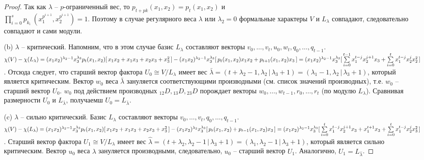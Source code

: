 \begin{proof} Так как $\lambda$ -- $p$-ограниченный вес, то $ p_{t + pk} (x_1, x_2) = p_{t} (x_1, x_2) $ и \\
$ \prod\limits_{i = 0}^{s}p_{k_i} ~(x_1^{p^{i + 1}}, x_2^{p^{i + 1}}) = 1 $. 
Поэтому в случае регулярного веса $\lambda$ или $ \lambda_2 = 0 $ формальные характеры $V$ и $ L_{\lambda} $ совпадают, 
следовательно совпадают и сами модули.

(b) $\lambda$ -- критический. Напомним, что в этом случае базис $ L_{\lambda} $ составляют векторы $ v_0, \ldots, v_t, u_0, w_t, q_0, \ldots, q_{t - 1} $.
\\
$ \chi(V) - \chi(L_{\lambda}) = (x_1 x_2)^{\lambda_2 - 1} x_3^{\lambda_3} p_t (x_1, x_2) [\,x_1 x_2 + x_1 x_3 + x_2 x_3 + x_3^2\,] - \\ 
(x_1 x_2)^{\lambda_2 - 1} x_3^{\lambda_3} [\,p_t (x_1, x_2) x_1 x_2 + p_{t + 1} (x_1, x_2) x_3\,] = (x_1 x_2)^{\lambda_2 - 1} x_3^{\lambda_3} 
[\,\sum \limits_{i = 0}^{t - 1} x_1^{t - j} x_2^{j + 1} x_3 + \sum \limits_{i = 0}^t x_1^{t - j} x_2^j x_2^2 \,] $.
Отсюда следует, что старший вектор фактора $ U_0 \cong V/L_{\lambda} $ имеет вес 
$ \bar{\lambda} = (t + \lambda_2 - 1, \lambda_2 \,|\, \lambda_3 + 1) = (\lambda_1 - 1, \lambda_2 \,|\, \lambda_3 + 1) $, который является критическим.
Вектор $ w_0 $ веса $ \bar{\lambda} $ зануляется соответствующими производными (см. список значений производных), 
т.е. $ w_0 $ -- старший вектор $ U_0 $. $ w_0 $ под действием производных $ {_{12}D}, {_{13}D}, {_{23}D} $ 
порождает векторы $ w_0, \ldots, w_{t - 1}, r_0, \ldots, r_t $ (по модулю $ L_{\lambda} $). 
Сравнивая размерности $ U_0 $ и $L_{\bar{\lambda}} $, получаемш $ U_0 = L_{\bar{\lambda}} $.

(c) $\lambda$ -- сильно критический. Базис $ L_{\lambda} $ составляют векторы $ v_0, \ldots, v_t, q_0, \ldots, q_{t - 1} $.
\\
$ \chi(V) - \chi(L_{\lambda}) = (x_1 x_2)^{\lambda_2 - 1} x_3^{\lambda_3} p_t (x_1, x_2) [\,x_1 x_2 + x_1 x_3 + x_2 x_3 + x_3^2\,] - \\
(x_1 x_2)^{\lambda_2} x_3^{\lambda_3} [\,p_t (x_1, x_2) + p_{t - 1} (x_1, x_2) x_3 \,] =  (x_1 x_2)^{\lambda_2 - 1} x_3^{\lambda_3} 
[\, \sum \limits_{i = 0}^t x_1^{t - j} x_2^{j + 1} x_3 + x_1^{t + 1} x_3 + \sum \limits_{i = 0}^t x_1^{t - j} x_2^j x_3^2 \,] $.
Старший вектор фактора $ U_1 \cong V/L_{\lambda} $ имеет вес 
$ \hat{\lambda} = (t + \lambda_2, \lambda_2 - 1 \,|\, \lambda_3 + 1) = (\lambda_1, \lambda_2 - 1 \,|\, \lambda_3 + 1) $, 
который является сильно критическим. Вектор $ u_0 $ веса $ \hat{\lambda} $ зануляется производными, 
следовательно, $ u_0 $ -- старший вектор $ U_1 $. Аналогично, $ U_1 = L_{\hat{\lambda}} $.
\end{proof}
